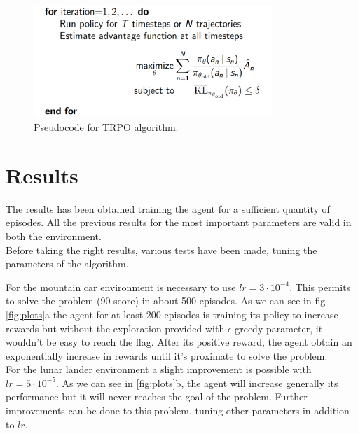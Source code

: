 \documentclass[11pt]{article}
\begin{document}
\begin{figure}[t]
        \includegraphics[width=9cm]{pseudocode}
        \centering
        \caption{Pseudocode for TRPO algorithm.}
        \label{fig:pseudocode}
\end{figure}

\section{Results}
The results has been obtained training the agent for a sufficient quantity of episodes.
All the previous results for the most important parameters are valid in both the
environment.
\\
Before taking the right results, various tests have been made, tuning the parameters of
the algorithm.

For the mountain car environment is necessary to use $lr = 3 \cdot 10^{-4}$. This permits
to solve the problem (90 score) in about 500 episodes. As we can see in fig
\ref{fig:plots}a the agent for at least 200 episodes is training its policy to increase
rewards but without the exploration provided with $\epsilon$-greedy parameter, it wouldn't
be easy to reach the flag. After its positive reward, the agent obtain an exponentially
increase in rewards until it's proximate to solve the problem. 
\\
For the lunar lander environment a slight improvement is possible with $lr = 5 \cdot
10^{-5}$. As we can see in \ref{fig:plots}b, the agent will increase generally its
performance but it will never reaches the goal of the problem. 
Further improvements can be done to this problem, tuning other parameters in addition to $lr$.
\end{document}
